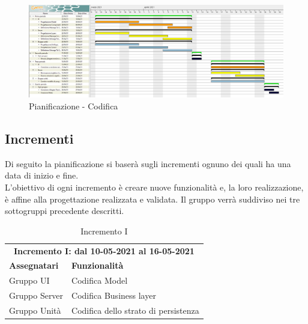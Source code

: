 \newpage
\begin{landscape}
	\begin{figure}[h!]
		\includegraphics[width=24cm]{images/5_periodi}
		\caption{Pianificazione - Codifica }
	\end{figure}
\end{landscape}

\clearpage
 \subsection{Incrementi}
 Di seguito la pianificazione si baserà sugli incrementi ognuno dei quali ha una data di inizio e fine.\\
  L'obiettivo di ogni incremento è creare nuove funzionalità e, la loro realizzazione, è affine alla progettazione realizzata e validata.
  Il gruppo verrà suddiviso nei tre sottogruppi precedente descritti.
  
  \begin{table} [h!]
  	\begin{center}
  		\begin{tabular} { m{4cm}  m{11cm}  }	
  			\multicolumn{2}{c}{	\textbf{Incremento I: dal 10-05-2021 al 16-05-2021}} \\
  			\rowcolor{lightgray}
  			\textbf{Assegnatari} & \textbf{Funzionalità} \\
  			Gruppo UI & Codifica Model\\
  			Gruppo Server & Codifica Business layer\\
  			Gruppo Unità & Codifica dello strato di persistenza\\	
  		\end{tabular}
  		\caption{Incremento I}
  	\end{center}
  \end{table}

